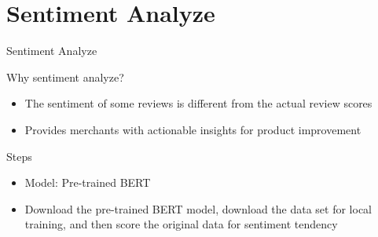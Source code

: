 \section{Sentiment Analyze}

\begin{frame}{Sentiment Analyze}
    
	\begin{block}{Why sentiment analyze?}
		\begin{itemize}
			\item The sentiment of some reviews is different from the actual review scores
			\item Provides merchants with actionable insights for product improvement
		\end{itemize}
	\end{block}
    
	\begin{block}{Steps}
		\begin{itemize}
			\item Model: Pre-trained BERT
			\item Download the pre-trained BERT model, download the data set for local training, and then score the original data for sentiment tendency
		\end{itemize}
	\end{block}

\end{frame}


